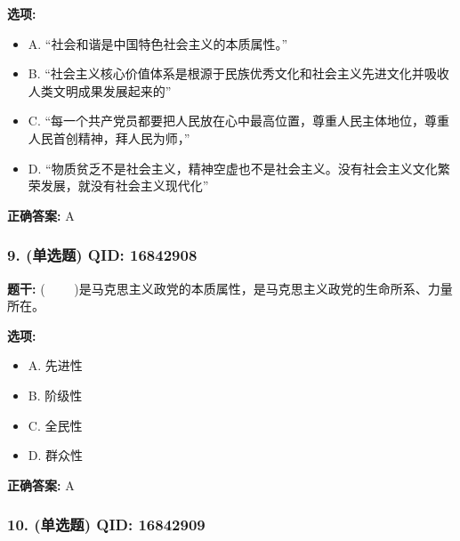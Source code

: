 \documentclass[12pt,UTF8]{ctexart}
\begin{document}
\textbf{选项:}
\begin{itemize}[leftmargin=*]

  \item A. “社会和谐是中国特色社会主义的本质属性。”

  \item B. “社会主义核心价值体系是根源于民族优秀文化和社会主义先进文化并吸收人类文明成果发展起来的”

  \item C. “每一个共产党员都要把人民放在心中最高位置，尊重人民主体地位，尊重人民首创精神，拜人民为师，”

  \item D. “物质贫乏不是社会主义，精神空虚也不是社会主义。没有社会主义文化繁荣发展，就没有社会主义现代化”

\end{itemize}

\textbf{正确答案:}
A

\vspace{0.3em}\hrulefill\vspace{0.7em}

\subsubsection*{9. (单选题) \small QID: 16842908}

\textbf{题干:}
(     )是马克思主义政党的本质属性，是马克思主义政党的生命所系、力量所在。

\textbf{选项:}
\begin{itemize}[leftmargin=*]

  \item A. 先进性

  \item B. 阶级性

  \item C. 全民性

  \item D. 群众性

\end{itemize}

\textbf{正确答案:}
A

\vspace{0.3em}\hrulefill\vspace{0.7em}

\subsubsection*{10. (单选题) \small QID: 16842909}
\end{document}
